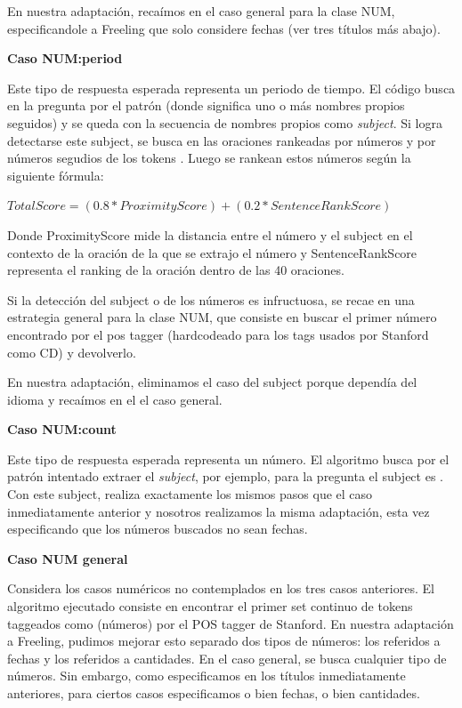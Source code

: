 En nuestra adaptación, recaímos en el caso general para la clase NUM, especificandole a Freeling que solo considere fechas (ver tres títulos más abajo).

\textbf{Caso NUM:period} \newline

Este tipo de respuesta esperada representa un periodo de tiempo. El código busca en la pregunta por el patrón  (donde  significa uno o más nombres propios seguidos) y se queda con la secuencia de nombres propios como \textit{subject}. 
Si logra detectarse este subject, se busca en las oraciones rankeadas por números y por números segudios de los tokens . Luego se rankean estos números según la siguiente fórmula:\newline

$TotalScore = (0.8 * ProximityScore) + (0.2 * SentenceRankScore)$ \newline

Donde ProximityScore mide la distancia entre el número y el subject en el contexto de la oración de la que se extrajo el número y SentenceRankScore representa el ranking de la oración dentro de las 40 oraciones.

Si la detección del subject o de los números es infructuosa, se recae en una estrategia general para la clase NUM, que consiste en buscar el primer número encontrado por el pos tagger (hardcodeado para los tags usados por Stanford como CD) y devolverlo. 

En nuestra adaptación, eliminamos el caso del subject porque dependía del idioma y recaímos en el el caso general. \newline

\textbf{Caso NUM:count} \newline

Este tipo de respuesta esperada representa un número. El algoritmo busca por el patrón  intentado extraer el \textit{subject}, por ejemplo, para la pregunta  el subject es . Con este subject, realiza exactamente los mismos pasos que el caso inmediatamente anterior y nosotros realizamos la misma adaptación, esta vez especificando que los números buscados no sean fechas. \newline


\textbf{Caso NUM general} \newline

Considera los casos numéricos no contemplados en los tres casos anteriores. El algoritmo ejecutado consiste en encontrar el primer set continuo de tokens taggeados como  (números) por el POS tagger de Stanford. En nuestra adaptación a Freeling, pudimos mejorar esto separado dos tipos de números: los referidos a fechas y los referidos a cantidades. En el caso general, se busca cualquier tipo de números. Sin embargo, como especificamos en los títulos inmediatamente anteriores, para ciertos casos especificamos o bien fechas, o bien cantidades. \newline

